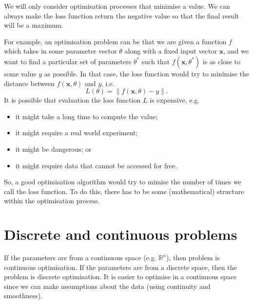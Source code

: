 \documentclass[a4paper, openany]{memoir}
\begin{document}
We will only consider optimisation processes that minimise a value. We can always make the loss function return the negative value so that the final result will be a maximum.

For example, an optimisation problem can be that we are given a function $f$ which takes in some parameter vector $\theta$ along with a fixed input vector $\mathbf{x}$, and we want to find a particular set of parameters $\theta^*$ such that $f(\mathbf{x}, \theta^*)$ is as close to some value $y$ as possible. In that case, the loss function would try to minimise the distance between $f(\mathbf{x}, \theta)$ and $y$, i.e.
\[L(\theta) = \lVert f(\mathbf{x}, \theta) - y \rVert.\]
It is possible that evaluation the loss function $L$ is expensive, e.g.
\begin{itemize}
    \item it might take a long time to compute the value;
    \item it might require a real world experiment;
    \item it might be dangerous; or
    \item it might require data that cannot be accessed for free.
\end{itemize}
So, a good optimisation algorithm would try to mimise the number of times we call the loss function. To do this, there has to be some (mathematical) structure within the optimisation process.

\section{Discrete and continuous problems}
If the parameters are from a continuous space (e.g. $\mathbb{R}^n$), then problem is continuous optimisation. If the parameters are from a discrete space, then the problem is discrete optimisation. It is easier to optimise in a continuous space since we can make assumptions about the data (using continuity and smoothness).
\end{document}
